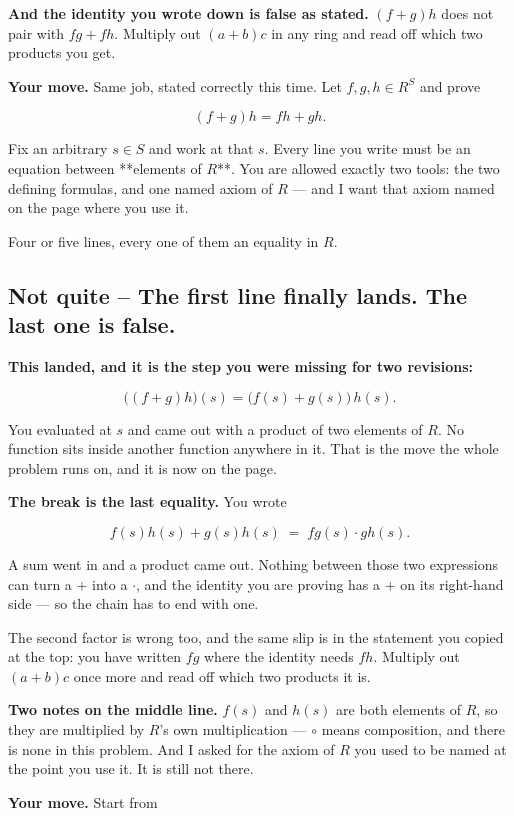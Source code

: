 \documentclass[11pt]{article}
\begin{document}
\textbf{And the identity you wrote down is false as stated.} $(f+g)h$ does not pair with $fg + fh$. Multiply out $(a+b)c$ in any ring and read off which two products you get.

\textbf{Your move.} Same job, stated correctly this time. Let $f, g, h \in R^S$ and prove

$$(f+g)h = fh + gh.$$

Fix an arbitrary $s \in S$ and work at that $s$. Every line you write must be an equation between **elements of $R$**. You are allowed exactly two tools: the two defining formulas, and one named axiom of $R$ --- and I want that axiom named on the page where you use it.

Four or five lines, every one of them an equality in $R$.


\subsection*{Not quite -- The first line finally lands. The last one is false.}
\textbf{This landed, and it is the step you were missing for two revisions:}

$$\big((f+g)h\big)(s) = \big(f(s) + g(s)\big)\,h(s).$$

You evaluated at $s$ and came out with a product of two elements of $R$. No function sits inside another function anywhere in it. That is the move the whole problem runs on, and it is now on the page.

\textbf{The break is the last equality.} You wrote

$$f(s)h(s) + g(s)h(s) \;=\; fg(s) \cdot gh(s).$$

A sum went in and a product came out. Nothing between those two expressions can turn a $+$ into a $\cdot$, and the identity you are proving has a $+$ on its right-hand side --- so the chain has to end with one.

The second factor is wrong too, and the same slip is in the statement you copied at the top: you have written $fg$ where the identity needs $fh$. Multiply out $(a+b)c$ once more and read off which two products it is.

\textbf{Two notes on the middle line.} $f(s)$ and $h(s)$ are both elements of $R$, so they are multiplied by $R$'s own multiplication --- $\circ$ means composition, and there is none in this problem. And I asked for the axiom of $R$ you used to be named at the point you use it. It is still not there.

\textbf{Your move.} Start from
\end{document}
